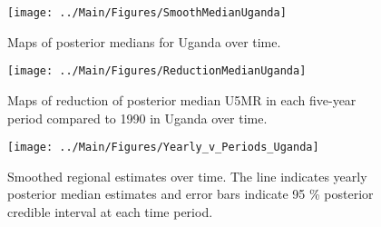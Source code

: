 \documentclass[12pt]{article}\usepackage[]{graphicx}\usepackage[]{color}
\newenvironment{knitrout}{}{} %
\begin{document}
\begin{knitrout}
\color{fgcolor}\begin{figure}[bht]

{\centering \texttt{[image: ../Main/Figures/SmoothMedianUganda]} 

}

\caption[Maps of posterior medians for Uganda  over time]{Maps of posterior medians for Uganda  over time.}\label{fig:unnamed-chunk-324}
\end{figure}


\end{knitrout}
\begin{knitrout}
\color{fgcolor}\begin{figure}[bht]

{\centering \texttt{[image: ../Main/Figures/ReductionMedianUganda]} 

}

\caption[Maps of reduction of posterior median U5MR in each five-year period compared to 1990 in Uganda over time]{Maps of reduction of posterior median U5MR in each five-year period compared to 1990 in Uganda over time.}\label{fig:unnamed-chunk-325}
\end{figure}


\end{knitrout}
\begin{knitrout}
\color{fgcolor}\begin{figure}[bht]

{\centering \texttt{[image: ../Main/Figures/Yearly\_v\_Periods\_Uganda]} 

}

\caption[Smoothed regional estimates over time]{Smoothed regional estimates over time. The line indicates yearly posterior median estimates and error bars indicate 95 \% posterior credible interval at each time period.}\label{fig:unnamed-chunk-326}
\end{figure}


\end{knitrout}
\end{document}
